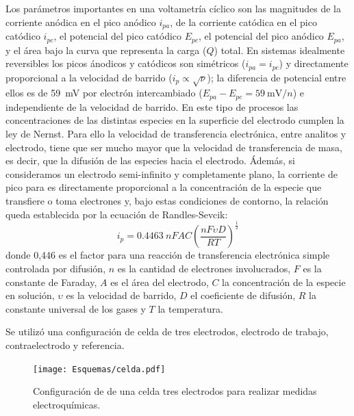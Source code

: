 	 Los parámetros importantes en una voltametría cíclico son las magnitudes de la corriente anódica en el pico anódico $i_{pa}$, de la corriente catódica en el pico catódico $i_{pc}$, el potencial del pico catódico $E_{pc}$, el potencial del pico anódico $E_{pa}$, y el área bajo la curva que representa la carga ($Q$) total. 
	 En sistemas idealmente reversibles los picos ánodicos y catódicos son simétricos ($i_{pa}=i_{pc}$) y directamente proporcional a la velocidad de barrido ($i_p \propto \sqrt{\nu}$); la diferencia de potencial entre ellos es de \SI{59}{\milli\volt} por electrón intercambiado ($E_{pa}-E_{pc}=\SI{59}{\milli\volt\per n}$) e independiente de la velocidad de barrido. En este tipo de procesos las concentraciones de las distintas especies en la superficie del electrodo cumplen la ley de Nernst.\cite{Wi2000,Villullas2000,Gosser}
	 Para ello la velocidad de transferencia electrónica, entre analitos y electrodo, tiene que ser mucho mayor que la velocidad de transferencia de masa, es decir, que la difusión de las especies hacia el electrodo. Ádemás, si consideramos un electrodo semi-infinito y completamente plano, la corriente de pico para es directamente proporcional a la concentración de la especie que transfiere o toma electrones y, bajo estas condiciones de contorno, la relación queda establecida por la ecuación de Randles-Sevcik:
				\begin{equation}
					i_p=0.4463\: nFAC \left(\frac{nF\upsilon D}{RT}\right)^{\frac{1}{2}}
					\label{eq:randles-sevnic}
				\end{equation}
	 donde 0,446 es el factor para una reacción de transferencia electrónica simple controlada por difusión, $n$ es la cantidad de electrones involucrados, $F$ es la constante de Faraday, $A$ es el área del electrodo, $C$ la concentración de la especie en solución, $\upsilon$ es la velocidad de barrido, $D$ el coeficiente de difusión, $R$ la constante universal de los gases y $T$ la temperatura.

	 Se utilizó una configuración de celda de tres electrodos, electrodo de trabajo, contraelectrodo y referencia. 
	 				\begin{figure}[!ht]
			 		  \begin{center}
			 		  \texttt{[image: Esquemas/celda.pdf]}
			 		  \caption[Configuración de una celda de tres electrodos]{Configuración de de una celda tres electrodos para realizar medidas electroquímica\index{electroquimico}s.}
			 		  \label{fig:celda}
			 		  \end{center}
			 		  \end{figure}

